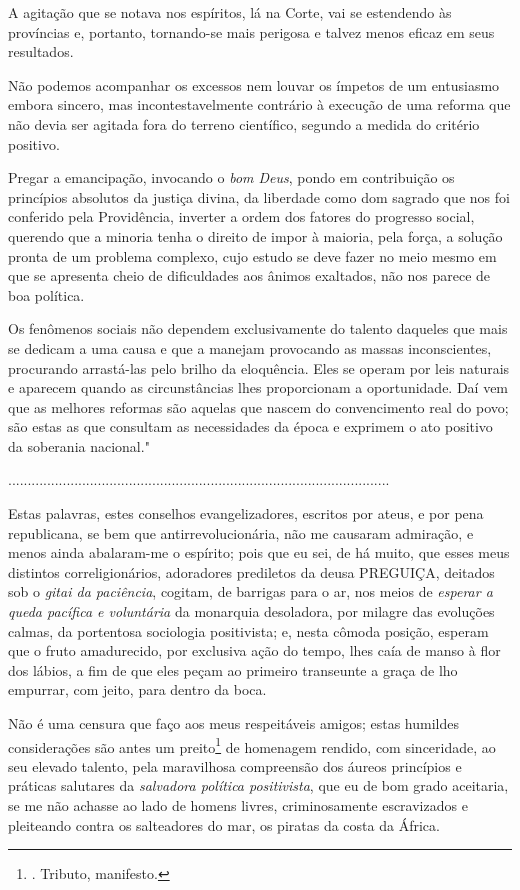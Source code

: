A agitação que se notava nos espíritos, lá na Corte, vai se estendendo
às províncias e, portanto, tornando-se mais perigosa e talvez menos
eficaz em seus resultados.

Não podemos acompanhar os excessos nem louvar os ímpetos de um
entusiasmo embora sincero, mas incontestavelmente contrário à execução
de uma reforma que não devia ser agitada fora do terreno científico,
segundo a medida do critério positivo.

Pregar a emancipação, invocando o \emph{bom Deus}, pondo em contribuição
os princípios absolutos da justiça divina, da liberdade como dom sagrado
que nos foi conferido pela Providência, inverter a ordem dos fatores do
progresso social, querendo que a minoria tenha o direito de impor à
maioria, pela força, a solução pronta de um problema complexo, cujo
estudo se deve fazer no meio mesmo em que se apresenta cheio de
dificuldades aos ânimos exaltados, não nos parece de boa política.

Os fenômenos sociais não dependem exclusivamente do talento daqueles que
mais se dedicam a uma causa e que a manejam provocando as massas
inconscientes, procurando arrastá-las pelo brilho da eloquência. Eles se
operam por leis naturais e aparecem quando as circunstâncias lhes
proporcionam a oportunidade. Daí vem que as melhores reformas são
aquelas que nascem do convencimento real do povo; são estas as que
consultam as necessidades da época e exprimem o ato positivo da
soberania nacional."

..................................................................................................

Estas palavras, estes conselhos evangelizadores, escritos por ateus, e
por pena republicana, se bem que antirrevolucionária, não me causaram
admiração, e menos ainda abalaram-me o espírito; pois que eu sei, de há
muito, que esses meus distintos correligionários, adoradores prediletos
da deusa PREGUIÇA, deitados sob o \emph{gitai da paciência}, cogitam, de
barrigas para o ar, nos meios de \emph{esperar a queda pacífica e
voluntária} da monarquia desoladora, por milagre das evoluções calmas,
da portentosa sociologia positivista; e, nesta cômoda posição, esperam
que o fruto amadurecido, por exclusiva ação do tempo, lhes caía de manso
à flor dos lábios, a fim de que eles peçam ao primeiro transeunte a
graça de lho empurrar, com jeito, para dentro da boca.

Não é uma censura que faço aos meus respeitáveis amigos; estas humildes
considerações são antes um preito\footnote{. Tributo, manifesto.} de
homenagem rendido, com sinceridade, ao seu elevado talento, pela
maravilhosa compreensão dos áureos princípios e práticas salutares da
\emph{salvadora política positivista}, que eu de bom grado aceitaria, se
me não achasse ao lado de homens livres, criminosamente escravizados e
pleiteando contra os salteadores do mar, os piratas da costa da África.

